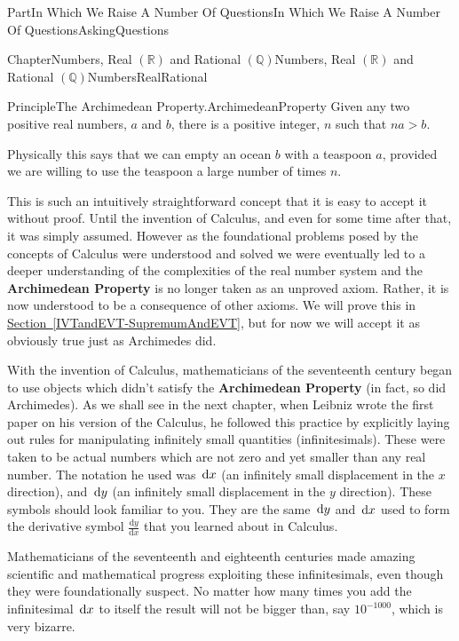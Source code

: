 \documentclass[oneside,10pt,]{book}
\newcommand{\xreffont}{\relax}
\newcommand{\terminology}[1]{\textbf{#1}}
\numberwithin{equation}{part}
\newcommand{\dx}[1]{\,{\rm d}#1}
\newcommand{\dfdx}[2]{\frac{\text{d}{#1}}{\text{d}{#2}}}
\newcommand{\RR}{\mathbb {R}}
\newcommand{\QQ}{\mathbb {Q}}
\begin{document}
\begin{partptx}{Part}{In Which We Raise A Number Of Questions}{}{In Which We Raise A Number Of Questions}{}{}{AskingQuestions}
\begin{chapterptx}{Chapter}{Numbers, Real \(\left(\RR\right)\) and Rational \(\left(\QQ\right)\)}{}{Numbers, Real \(\left(\RR\right)\) and Rational \(\left(\QQ\right)\)}{}{}{NumbersRealRational}
\begin{principle}{Principle}{The Archimedean Property.}{}{ArchimedeanProperty}%
 Given any two positive real numbers, \(a\) and \(b\), there is a positive integer, \(n\) such that \(na>b\).%
\end{principle}
Physically this says that we can empty an ocean \(b\) with a teaspoon \(a\), provided we are willing to use the teaspoon a large number of times \(n\).%
\par
This is such an intuitively straightforward concept that it is easy to accept it without proof.  Until the invention of Calculus, and even for some time after that, it was simply assumed.  However as the foundational problems posed by the concepts of Calculus were understood and solved we were eventually led to a deeper understanding of the complexities of the real number system and the \terminology{Archimedean Property} is no longer taken as an unproved axiom. Rather, it is now understood to be a consequence of other axioms.  We will prove this in \hyperref[IVTandEVT-SupremumAndEVT]{Section~{\xreffont\ref{IVTandEVT-SupremumAndEVT}}}, but for now we will accept it as obviously true just as Archimedes did.%
\par
{} With the invention of Calculus, mathematicians of the seventeenth century began to use objects which didn't satisfy the \terminology{Archimedean Property} (in fact, so did Archimedes). As we shall see in the next chapter, when Leibniz wrote the first paper on his version of the Calculus, he followed this practice by explicitly laying out rules for manipulating infinitely small quantities (infinitesimals).  These were taken to be actual numbers which are not zero and yet smaller than any real number. The notation he used was \(\dx{ x}\) (an infinitely small displacement in the \(x\) direction), and \(\dx{ y}\) (an infinitely small displacement in the \(y\) direction).  These symbols should look familiar to you.  They are the same \(\dx{
y}\) and \(\dx{ x}\) used to form the derivative symbol \(\dfdx{y}{x}\) that you learned about in Calculus.%
\par
Mathematicians of the seventeenth and eighteenth centuries made amazing scientific and mathematical progress exploiting these infinitesimals, even though they were foundationally suspect. No matter how many times you add the infinitesimal \(\dx{ x}\) to itself the result will not be bigger than, say \(10^{-1000}\), which is very bizarre.%
\par

\end{chapterptx}
\end{partptx}
\end{document}
